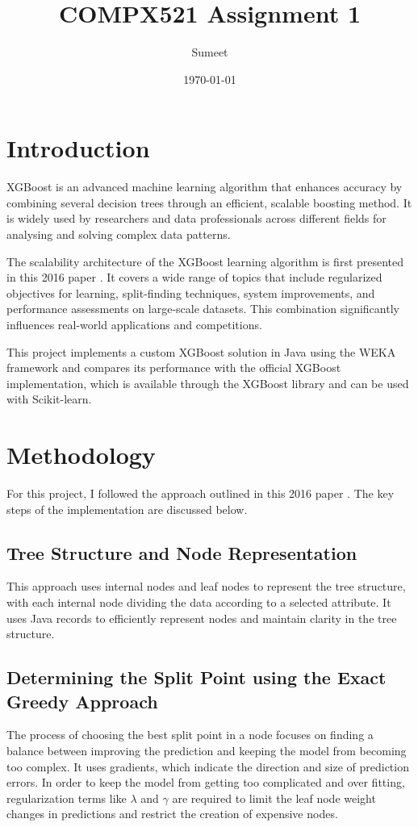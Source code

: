 \documentclass{article}
\title{COMPX521 Assignment 1}
\author{Sumeet}
\date{\today}
\begin{document}
\maketitle

\section{Introduction}
XGBoost is an advanced machine learning algorithm that enhances accuracy by combining several decision trees through an efficient, scalable boosting method. It is widely used by researchers and data professionals across different fields for analysing and solving complex data patterns.

The scalability architecture of the XGBoost learning algorithm is first presented in this 2016 paper \cite{chen2016xgboost}. It covers a wide range of topics that include regularized objectives for learning, split-finding techniques, system improvements, and performance assessments on large-scale datasets. This combination significantly influences real-world applications and competitions.

This project implements a custom XGBoost solution in Java using the WEKA framework \cite{weka_book} and compares its performance with the official XGBoost implementation, which is available through the XGBoost library and can be used with Scikit-learn.

\section{Methodology}
For this project, I followed the approach outlined in this 2016 paper \cite{chen2016xgboost}. The key steps of the implementation are discussed below.

\subsection{Tree Structure and Node Representation}
This approach uses internal nodes and leaf nodes to represent the tree structure, with each internal node dividing the data according to a selected attribute. It uses Java records to efficiently represent nodes and maintain clarity in the tree structure.

\subsection{Determining the Split Point using the Exact Greedy Approach}
The process of choosing the best split point in a node focuses on finding a balance between improving the prediction and keeping the model from becoming too complex. It uses gradients, which indicate the direction and size of prediction errors. In order to keep the model from getting too complicated and over fitting, regularization terms like $\lambda$ and $\gamma$ are required to limit the leaf node weight changes in predictions and restrict the creation of expensive nodes.
\end{document}
